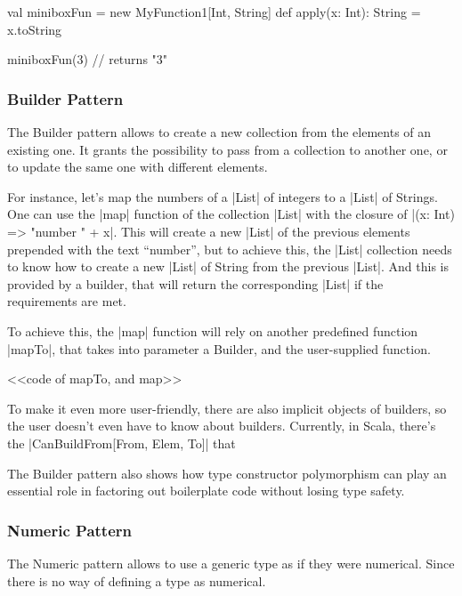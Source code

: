 \begin{lstlisting-nobreak}
 val miniboxFun = new MyFunction1[Int, String] {
   def apply(x: Int): String = x.toString
 }
 
 miniboxFun(3)    // returns "3"
\end{lstlisting-nobreak}

\subsubsection{Builder Pattern}

The Builder pattern allows to create a new collection from the elements of an existing one. It grants the possibility to pass from a collection to another one, or to update the same one with different elements.


For instance, let's map the numbers of a |List| of integers to a |List| of Strings. One can use the |map| function of the collection |List| with the closure of |(x: Int) => "number " + x|. This will create a new |List| of the previous elements prepended with the text ``number'', but to achieve this, the |List| collection needs to know how to create a new |List| of String from the previous |List|. And this is provided by a builder, that will return the corresponding |List| if the requirements are met.

To achieve this, the |map| function will rely on another predefined function |mapTo|, that takes into parameter a Builder, and the user-supplied function.

<<code of mapTo, and map>>


To make it even more user-friendly, there are also implicit objects of builders, so the user doesn't even have to know about builders. Currently, in Scala, there's the |CanBuildFrom[From, Elem, To]| that 

The Builder pattern also shows how type constructor polymorphism can play an essential role in factoring out boilerplate code without losing type safety.\cite{adriaan}

\subsubsection{Numeric Pattern}

The Numeric pattern allows to use a generic type as if they were numerical.
Since there is no way of defining a type as numerical.
